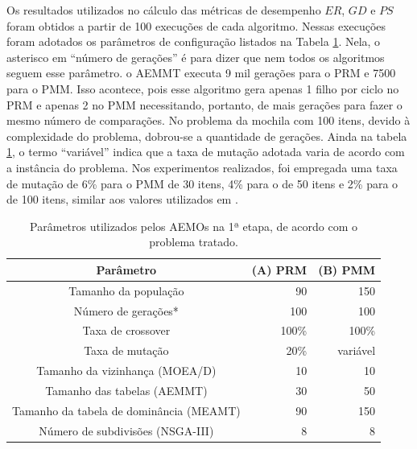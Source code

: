 Os resultados utilizados no cálculo das métricas de desempenho $ER$, $GD$ e $PS$ foram obtidos a partir de 100 execuções de cada algoritmo. Nessas execuções foram adotados os parâmetros de configuração listados na Tabela \ref{table_exp1_parametros}. Nela, o asterisco em ``número de gerações'' é para dizer que nem todos os algoritmos seguem esse parâmetro. o AEMMT executa 9 mil gerações para o PRM e 7500 para o PMM. Isso acontece, pois esse algoritmo gera apenas 1 filho por ciclo no PRM e apenas 2 no PMM necessitando, portanto, de mais gerações para fazer o mesmo número de comparações. No problema da mochila com 100 itens, devido à complexidade do problema, dobrou-se a quantidade de gerações. Ainda na tabela \ref{table_exp1_parametros}, o termo ``variável'' indica que a taxa de mutação adotada varia de acordo com a instância do problema. Nos experimentos realizados, foi empregada uma taxa de mutação de 6\% para o PMM de 30 itens, 4\% para o de 50 itens e 2\% para o de 100 itens, similar aos valores utilizados em \cite{Ishibuchi2015}.

\begin{table}[!htbp]
	\caption{Parâmetros utilizados pelos AEMOs na 1ª etapa, de acordo com o problema tratado.}
	\label{table_exp1_parametros}
	\begin{center}
		\begin{tabular}{c|r|r}
			\textbf{Parâmetro} & \textbf{(A) PRM} &  \textbf{(B) PMM} \\ %
			\hline
			Tamanho da população                    &    90 &      150 \\ %
			Número de gerações*                     &   100 &      100 \\ %
			Taxa de crossover                       & 100\% &    100\% \\ %
			Taxa de mutação                         &  20\% & variável \\ %
			Tamanho da vizinhança (MOEA/D)          &    10 &       10 \\ %
			Tamanho das tabelas (AEMMT)             &    30 &       50 \\ %
			Tamanho da tabela de dominância (MEAMT) &    90 &      150 \\ %
			Número de subdivisões (NSGA-III)        &     8 &        8 \\
			\hline
		\end{tabular}
	\end{center}
\end{table}

